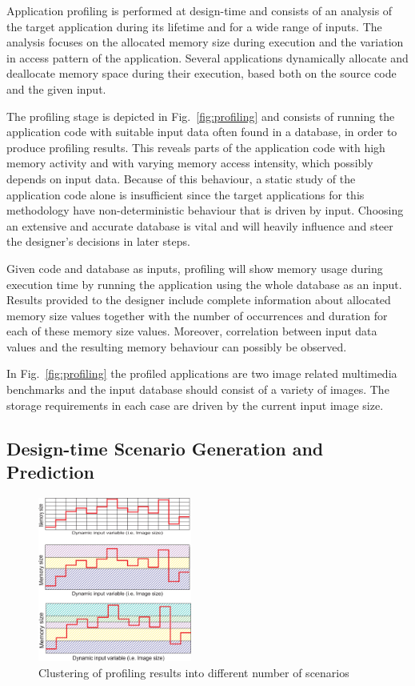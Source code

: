 \documentclass[a4paper,conference]{IEEEtran}
\begin{document}
Application profiling is performed at design-time and consists of an analysis of the target application during its lifetime and for a wide range of inputs. The analysis focuses on the allocated memory size during execution and the variation in access pattern of the application. Several applications dynamically allocate and deallocate memory space during their execution, based both on the source code and the given input. 

The profiling stage is depicted in Fig.~\ref{fig:profiling} and consists of running the application code with suitable input data often found in a database, in order to produce profiling results. This reveals parts of the application code with high memory activity and with varying memory access intensity, which possibly depends on input data. Because of this behaviour, a static study of the application code alone is insufficient since the target applications for this methodology have non-deterministic behaviour that is driven by input. Choosing an extensive and accurate database is vital and will heavily influence and steer the designer's decisions in later steps. 

Given code and database as inputs, profiling will show memory usage during execution time by running the application using the whole database as an input. Results provided to the designer include complete information about allocated memory size values together with the number of occurrences and duration for each of these memory size values. Moreover, correlation between input data values and the resulting memory behaviour can possibly be observed. 

In Fig.~\ref{fig:profiling} the profiled applications are two image related multimedia benchmarks and the input database should consist of a variety of images. The storage requirements in each case are driven by the current input image size. 

\subsection{Design-time Scenario Generation and Prediction}

\begin{figure}[!t]
\centering
\includegraphics[width=0.45\textwidth]{Images/1Dclustering.eps}
\caption{Clustering of profiling results into different number of scenarios}
\label{fig:clustering}
\end{figure}
\end{document}
